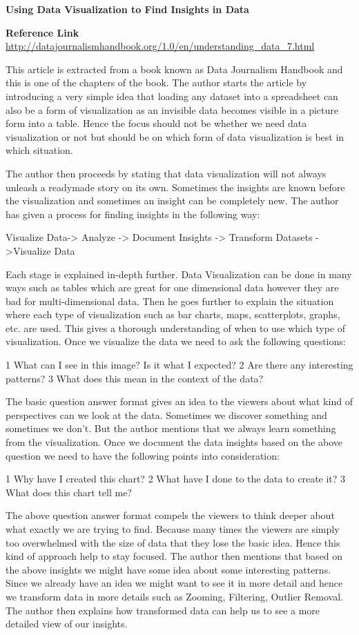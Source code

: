 \documentclass[]{book}
\theoremstyle{definition}
\theoremstyle{definition}
\theoremstyle{definition}
\theoremstyle{remark}
\begin{document}
\textbf{Using Data Visualization to Find Insights in Data}

\textbf{Reference Link}
\url{http://datajournalismhandbook.org/1.0/en/understanding_data_7.html}

This article is extracted from a book known as Data Journalism Handbook
and this is one of the chapters of the book. The author starts the
article by introducing a very simple idea that loading any dataset into
a spreadsheet can also be a form of visualization as an invisible data
becomes visible in a picture form into a table. Hence the focus should
not be whether we need data visualization or not but should be on which
form of data visualization is best in which situation.

The author then proceeds by stating that data visualization will not
always unleash a readymade story on its own. Sometimes the insights are
known before the visualization and sometimes an insight can be
completely new. The author has given a process for finding insights in
the following way:

Visualize Data-\textgreater{} Analyze -\textgreater{} Document Insights
-\textgreater{} Transform Datasets -\textgreater{}Visualize Data

Each stage is explained in-depth further. Data Visualization can be done
in many ways such as tables which are great for one dimensional data
however they are bad for multi-dimensional data. Then he goes further to
explain the situation where each type of visualization such as bar
charts, maps, scatterplots, graphs, etc. are used. This gives a thorough
understanding of when to use which type of visualization. Once we
visualize the data we need to ask the following questions:

1 What can I see in this image? Is it what I expected? 2 Are there any
interesting patterns? 3 What does this mean in the context of the data?

The basic question answer format gives an idea to the viewers about what
kind of perspectives can we look at the data. Sometimes we discover
something and sometimes we don't. But the author mentions that we always
learn something from the visualization. Once we document the data
insights based on the above question we need to have the following
points into consideration:

1 Why have I created this chart? 2 What have I done to the data to
create it? 3 What does this chart tell me?

The above question answer format compels the viewers to think deeper
about what exactly we are trying to find. Because many times the viewers
are simply too overwhelmed with the size of data that they lose the
basic idea. Hence this kind of approach help to stay focused. The author
then mentions that based on the above insights we might have some idea
about some interesting patterns. Since we already have an idea we might
want to see it in more detail and hence we transform data in more
details such as Zooming, Filtering, Outlier Removal. The author then
explains how transformed data can help us to see a more detailed view of
our insights.
\end{document}
